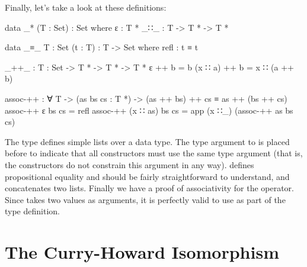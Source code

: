 	Finally, let's take a look at these definitions:

	\begin{code}
		data _* (T : Set) : Set where
		  ε : T *
		  _∷_ : T -> T * -> T *

		data _≡_ {T : Set} (t : T) : T -> Set where
		  refl : t ≡ t

		_++_ : {T : Set} -> T * -> T * -> T *
		ε ++ b = b
		(x ∷ a) ++ b = x ∷ (a ++ b)

		assoc-++ : ∀ {T} -> (as bs cs : T *) -> (as ++ bs) ++ cs ≡ as ++ (bs ++ cs)
		assoc-++ ε bs cs = refl
		assoc-++ (x ∷ as) bs cs = app (x ∷_) (assoc-++ as bs cs)
	\end{code}

	The type \codett{\_*} defines simple lists over a data type. The type
	argument to \codett{\_*} is placed before \codett{:} to indicate that all
	constructors must use the same type argument (that is, the constructors do
	not constrain this argument in any way).  defines
	propositional equality and should be fairly straightforward to understand,
	and \codett{\_++\_} concatenates two lists. Finally we have a proof of
	associativity for the \codett{\_++\_} operator. Since  takes
	two values as arguments, it is perfectly valid to use \codett{\_++\_} as
	part of the type definition.

	\section{The Curry-Howard Isomorphism}
